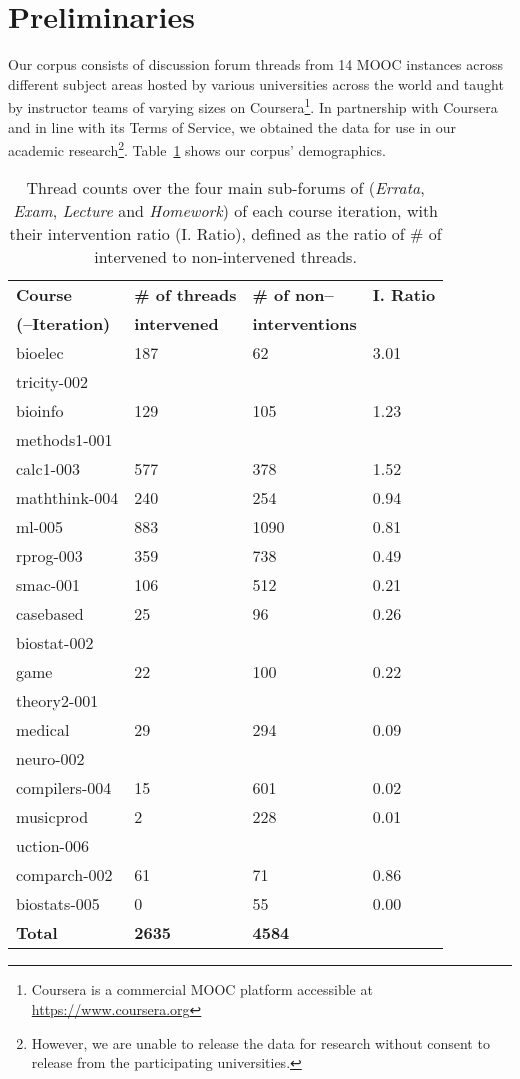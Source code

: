 \documentclass[11pt,a4paper]{article}
\begin{document}
\section{Preliminaries}
\label{sect:data}
Our corpus consists of discussion forum threads from 14 MOOC instances 
across different subject areas hosted by various universities across the 
world and taught by instructor teams of varying sizes
on Coursera\footnote{Coursera is a commercial MOOC platform accessible 
at \url{https://www.coursera.org}}. In partnership with Coursera and in line with its Terms of Service, we obtained the data for use in our academic 
research\footnote{However, we are unable to release the data for research 
without consent to release from the participating universities.}.
Table~\ref{tab:data} shows our corpus' demographics. 

\begin{table}[h]
\centering
\small
\begin{tabular}{|>{\scriptsize}l|>{\scriptsize}p{1cm}|>{\scriptsize}p{1.5cm}|>{\scriptsize}p{1cm}|}
\hline 
\bf Course & \bf \# of threads & \bf  \# of non--  & \bf I. Ratio \\ 
\bf (--Iteration) & \bf 	intervened	 & \bf interventions & \bf \\ 
\hline
\hline
{\sc bioelec} & 187& 62& 3.01\\
{\sc tricity-002} & & & \\
{\sc bioinfo} & 129& 105& 1.23\\
{\sc methods1-001} & & & \\
{\sc calc1-003} & 577& 378& 1.52\\
{\sc maththink-004} & 240& 254& 0.94\\
{\sc ml-005} & 883& 1090& 0.81\\
{\sc rprog-003}& 359& 738& 0.49\\
{\sc smac-001} & 106& 512& 0.21\\
{\sc casebased} & 25& 96& 0.26\\
{\sc biostat-002} & & & \\
{\sc game} & 22& 100& 0.22\\
{\sc theory2-001} & & & \\
{\sc medical} & 29& 294& 0.09 \\
{\sc neuro-002} & & & \\
{\sc compilers-004} & 15& 601& 0.02\\
{\sc musicprod} & 2& 228& 0.01\\
{\sc uction-006} & & & \\
{\sc comparch-002} & 61& 71& 0.86\\
{\sc biostats-005} & 0& 55& 0.00\\
\hline
\hline
\textbf{Total} & \textbf{2635}& \textbf{4584}& \\
\hline
\end{tabular}

\caption{\label{tab:data} Thread counts over the four main sub-forums
  of ({\it Errata}, {\it Exam}, {\it Lecture} and {\it Homework}) of
  each course iteration, with their intervention ratio (I. Ratio),
  defined as the ratio of \# of intervened to non-intervened threads.}
\end{table}
\end{document}
